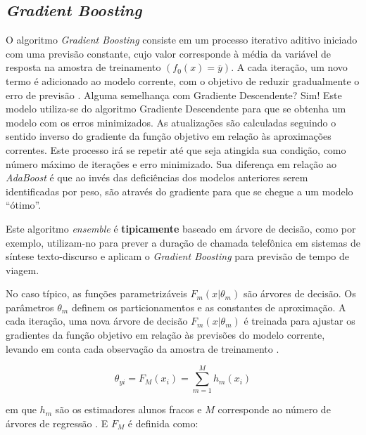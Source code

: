 \documentclass[
  openany]{book}
\begin{document}
\hypertarget{gradientboost}{%
\subsection{\texorpdfstring{\emph{Gradient Boosting}}{Gradient Boosting}}\label{gradientboost}}

O algoritmo \emph{Gradient Boosting} \citep{friedman1999bump} consiste em um processo iterativo aditivo iniciado com uma previsão constante, cujo valor corresponde à média da variável de resposta na amostra de treinamento \((f_0(x)=\overline{y})\). A cada iteração, um novo termo é adicionado ao modelo corrente, com o objetivo de reduzir gradualmente o erro de previsão \citep{mayrink2015avaliaccao}. Alguma semelhança com Gradiente Descendente? Sim! Este modelo utiliza-se do algoritmo Gradiente Descendente para que se obtenha um modelo com os erros minimizados. As atualizações são calculadas seguindo o sentido inverso do gradiente da função objetivo em relação às aproximações correntes. Este processo irá se repetir até que seja atingida sua condição, como número máximo de iterações e erro minimizado. Sua diferença em relação ao \emph{AdaBoost} é que ao invés das deficiências dos modelos anteriores serem identificadas por peso, são através do gradiente para que se chegue a um modelo ``ótimo''.

Este algoritmo \emph{ensemble} é \textbf{tipicamente} baseado em árvore de decisão, como por exemplo, \citet{yamagishi2008phone} utilizam-no para prever a duração de chamada telefônica em sistemas de síntese texto-discurso e \citet{zhang2015gradient} aplicam o \emph{Gradient Boosting} para previsão de tempo de viagem.

No caso típico, as funções parametrizáveis \(F_m(x|\theta_m)\) são árvores de decisão. Os parâmetros \(\theta_m\) definem os particionamentos e as constantes de aproximação. A cada iteração, uma nova árvore de decisão \(F_m(x|\theta_m)\) é treinada para ajustar os gradientes da função objetivo em relação às previsões do modelo corrente, levando em conta cada observação da amostra de treinamento \citep{freitas2020}.

\begin{equation}
   \theta_{yi}=F_M(x_i)=\displaystyle \sum^M_{m=1}h_m(x_i)
    \label{eq:gdboostarvore}
\end{equation}

em que \(h_m\) são os estimadores alunos fracos e \(M\) corresponde ao número de árvores de regressão \citep{ke2017lightgbm}.
E \(F_M\) é definida como:
\end{document}
